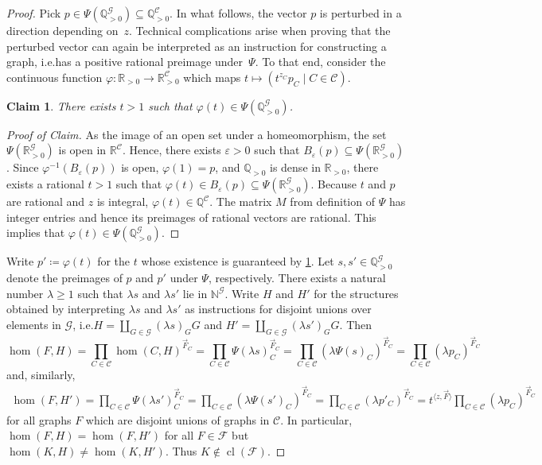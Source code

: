 \documentclass[3p,final]{elsarticle}
\renewcommand\phi\varphi
\DeclareMathOperator{\cl}{cl}
\newtheorem{claim}{Claim}[theorem]
\newenvironment{claimproof}[1][Proof of Claim]{\begin{proof}[#1] \renewcommand{\qedsymbol}{$\lrcorner$}}{ \end{proof}}
\renewcommand\epsilon\varepsilon
\begin{document}
\begin{proof}
		Pick $p \in \Psi(\mathbb{Q}^\mathcal{G}_{>0}) \subseteq \mathbb{Q}^\mathcal{C}_{>0}$. 
		In what follows, the vector $p$ is perturbed in a direction depending on~$z$. Technical complications arise when proving that the perturbed vector can again be interpreted as an instruction for constructing a graph, i.e.\@ has a positive rational preimage under~$\Psi$.
		To that end, consider the continuous function $\phi \colon \mathbb{R}_{>0} \to \mathbb{R}_{>0}^\mathcal{C}$ which maps $t \mapsto (t^{z_C} p_C \mid C \in \mathcal{C})$. 
		\begin{claim} \label{thm:kwiecien22-claim1}
			There exists $t > 1$ such that $\phi(t) \in \Psi(\mathbb{Q}^\mathcal{G}_{>0})$.
		\end{claim}
		\begin{claimproof}
			As the image of an open set under a homeomorphism, the set $\Psi(\mathbb{R}^\mathcal{G}_{>0})$ is open in $\mathbb{R}^{\mathcal{C}}$.
			Hence, there exists $\epsilon > 0$ such that $B_\epsilon(p) \subseteq \Psi(\mathbb{R}^\mathcal{G}_{>0})$.
			Since $\phi^{-1}(B_\epsilon(p))$ is open, $\phi(1) = p$, and $\mathbb{Q}_{>0}$ is dense in $\mathbb{R}_{>0}$, there exists a rational $t > 1$ such that $\phi(t) \in B_\epsilon(p) \subseteq \Psi(\mathbb{R}^\mathcal{G}_{>0})$.
			Because $t$ and $p$ are rational and $z$ is integral, $\phi(t) \in \mathbb{Q}^{\mathcal{C}}$. The matrix $M$ from definition of $\Psi$ has integer entries and hence its preimages of rational vectors are rational. This implies that $\phi(t) \in \Psi(\mathbb{Q}_{> 0}^{\mathcal{G}})$.
		\end{claimproof}
		Write $p' \coloneqq \phi(t)$ for the $t$ whose existence is guaranteed by \cref{thm:kwiecien22-claim1}.
		Let $s, s' \in \mathbb{Q}_{> 0}^{\mathcal{G}}$ denote the preimages of $p$ and $p'$ under $\Psi$, respectively. There exists a natural number $\lambda \geq 1$ such that $\lambda s$ and $\lambda s'$ lie in $\mathbb{N}^{\mathcal{G}}$. Write $H$ and $H'$ for the structures obtained by interpreting $\lambda s$ and $\lambda s'$ as instructions for disjoint unions over elements in $\mathcal{G}$, i.e.\@ $H = \coprod_{G \in \mathcal{G}} (\lambda s)_G G$ and $H' = \coprod_{G \in \mathcal{G}} (\lambda s')_G G$. Then
		\[
		\hom(F, H) 
		= \prod_{C \in \mathcal{C}} \hom(C, H)^{\vec{F}_C}
		= \prod_{C \in \mathcal{C}} \Psi(\lambda s)_C^{\vec{F}_C}
		= \prod_{C \in \mathcal{C}} \left(\lambda \Psi(s)_C\right)^{\vec{F}_C}
		= \prod_{C \in \mathcal{C}} \left(\lambda p_C \right)^{\vec{F}_C}
		\]
		and, similarly,
		\begin{align*}
			\hom(F, H') 
			= \prod_{C \in \mathcal{C}} \Psi(\lambda s')_C^{\vec{F}_C}
			= \prod_{C \in \mathcal{C}} \left(\lambda \Psi(s')_C\right)^{\vec{F}_C}
			= \prod_{C \in \mathcal{C}} \left(\lambda p'_C \right)^{\vec{F}_C}
			= t^{\langle z, \vec{F} \rangle} \prod_{C \in \mathcal{C}} \left(\lambda p_C \right)^{\vec{F}_C}
		\end{align*}
		for all graphs $F$ which are disjoint unions of graphs in $\mathcal{C}$. In particular, $\hom(F, H) = \hom(F, H')$ for all $F \in \mathcal{F}$ but $\hom(K, H) \neq \hom(K, H')$.
		Thus $K \not\in \cl(\mathcal{F})$.
	\end{proof}
\end{document}
